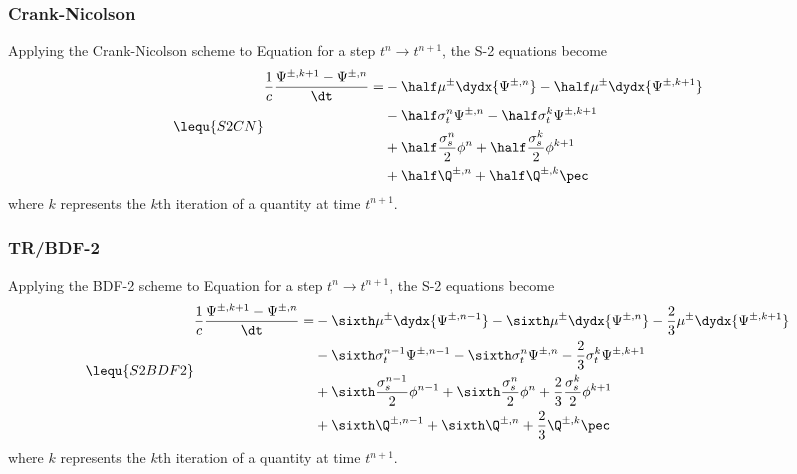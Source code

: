 \subsubsection{Crank-Nicolson}
Applying the Crank-Nicolson scheme to Equation  for a step
$t^n\rightarrow t^{n+1}$, the S-2 equations become
\begin{equation}\lequ{S2CN}\begin{split}
  \frac{1}{c}\frac{\Psi^{\pm,k+1}-\Psi^{\pm,n}}{\dt} = &
  -\half\mu^\pm\dydx{\Psi^{\pm,n}} -\half\mu^\pm\dydx{\Psi^{\pm,k+1}}\\
  &-\half\sigma_t^n\Psi^{\pm,n} -\half\sigma_t^k\Psi^{\pm,k+1}\\
  &+\half\frac{\sigma_s^n}{2}\phi^n +\half\frac{\sigma_s^k}{2}\phi^{k+1}\\
  &+\half\Q^{\pm,n} +\half\Q^{\pm,k} \pec
\end{split}\end{equation}
where $k$ represents the $k$th iteration of a quantity at time $t^{n+1}$.

\subsubsection{TR/BDF-2}
Applying the BDF-2 scheme to Equation  for a step
$t^{n}\rightarrow t^{n+1}$, the S-2 equations become
\begin{equation}\lequ{S2BDF2}\begin{split}
  \frac{1}{c}\frac{\Psi^{\pm,k+1}-\Psi^{\pm,n}}{\dt} = &
  -\sixth\mu^\pm\dydx{\Psi^{\pm,n-1}}
  -\sixth\mu^\pm\dydx{\Psi^{\pm,n}}
  -\frac{2}{3}\mu^\pm\dydx{\Psi^{\pm,k+1}}\\
  &-\sixth\sigma_t^{n-1}\Psi^{\pm,n-1}
   -\sixth\sigma_t^{n}  \Psi^{\pm,n}
   -\frac{2}{3}\sigma_t^k\Psi^{\pm,k+1}\\
  &+\sixth\frac{\sigma_s^{n-1}}{2}\phi^{n-1}
   +\sixth\frac{\sigma_s^{n}}{2}  \phi^{n}
   +\frac{2}{3}\frac{\sigma_s^k}{2}\phi^{k+1}\\
  &+\sixth\Q^{\pm,n-1}
   +\sixth\Q^{\pm,n}
   +\frac{2}{3}\Q^{\pm,k} \pec
\end{split}\end{equation}
where $k$ represents the $k$th iteration of a quantity at time $t^{n+1}$.


